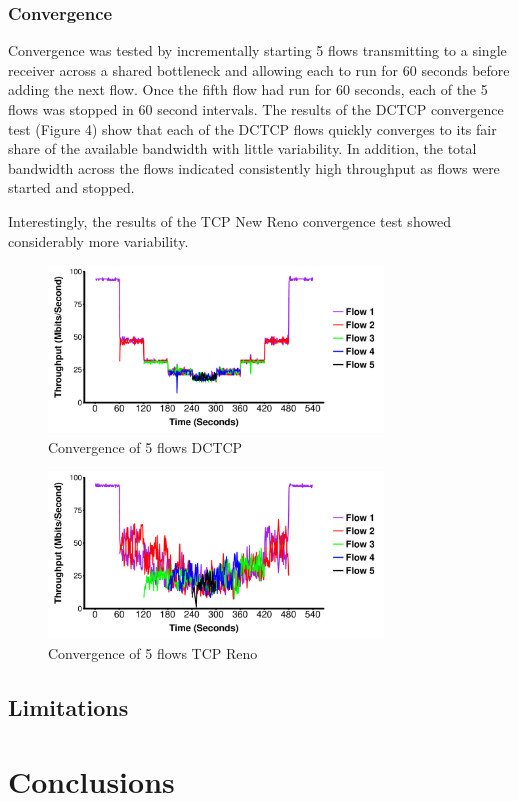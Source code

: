 \subsubsection{Convergence}

Convergence was tested by incrementally starting 5 flows transmitting to a single receiver across a shared bottleneck and allowing each to run for 60 seconds before adding the next flow. Once the fifth flow had run for 60 seconds, each of the 5 flows was stopped in 60 second intervals. The results of the DCTCP convergence test (Figure 4) show that each of the DCTCP flows quickly converges to its fair share of the available bandwidth with little variability. In addition, the total bandwidth across the flows indicated consistently high throughput as flows were started and stopped.

Interestingly, the results of the TCP New Reno convergence test showed considerably more variability.  

\begin{figure}
\includegraphics[height=1.75in,width=3.5in]{dctcp_converg}
\caption{Convergence of 5 flows DCTCP}
\end{figure}

\begin{figure}
\includegraphics[height=1.75in,width=3.5in]{reno_converg}
\caption{Convergence of 5 flows TCP Reno}
\end{figure}

\subsection{Limitations}

\section{Conclusions}

